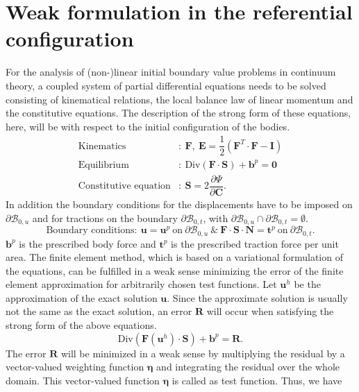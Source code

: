\documentclass[11pt,a4paper,final]{article}
\begin{document}
\section{Weak formulation in the referential configuration}
For the analysis of (non-)linear initial boundary value problems in continuum theory, a coupled system of partial differential equations needs to be solved consisting of kinematical relations, the local balance law of linear momentum and the constitutive equations. The description of the strong form of these equations, here, will be with respect to the initial configuration of the bodies. 
\begin{align*}
\text{Kinematics}&: \ \mathbf{F}, \ \mathbf{E} = \dfrac{1}{2} (\mathbf{F}^T \cdot \mathbf{F} - \mathbf{I}) \\
\text{Equilibrium}&: \ \text{Div}(\mathbf{F} \cdot \mathbf{S}) + \mathbf{b}^p = \mathbf{0} \\
\text{Constitutive equation}&: \ \mathbf{S} = 2\dfrac{\partial \Psi}{\partial \mathbf{C}}.
\end{align*}
In addition the boundary conditions for the displacements have to be imposed on $\partial \mathcal{B}_{0,u}$ and for tractions on the boundary $\partial \mathcal{B}_{0,t}$, with $\partial \mathcal{B}_{0,u} \cap \partial \mathcal{B}_{0,t} = \emptyset$.
\begin{equation*}
\text{Boundary conditions} : \ \mathbf{u} = \mathbf{u}^p \ \text{on} \ \partial \mathcal{B}_{0,u} \ \& \ \mathbf{F} \cdot \mathbf{S} \cdot \mathbf{N} = \mathbf{t}^p \ \text{on} \ \partial \mathcal{B}_{0,t}.
\end{equation*}
$\mathbf{b}^p$ is the prescribed body force and $\mathbf{t}^p$ is the prescribed traction force per unit area. The finite element method, which is based on a variational formulation of the equations, can be fulfilled in a weak sense minimizing the error of the finite element approximation for arbitrarily chosen test functions. Let $\mathbf{u}^h$ be the approximation of the exact solution $\mathbf{u}$. Since the approximate solution is usually not the same as the exact solution, an error $\mathbf{R}$ will occur when satisfying the strong form of the above equations.
\begin{equation}
\text{Div}(\mathbf{F}(\mathbf{u}^h) \cdot \mathbf{S}) + \mathbf{b}^p = \mathbf{R}.
\end{equation}
The error $\mathbf{R}$ will be minimized in a weak sense by multiplying the residual by a vector-valued weighting function $\bm{\eta}$ and integrating the residual over the whole domain. This vector-valued function $\bm{\eta}$ is called as test function. Thus, we have
\end{document}
